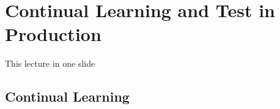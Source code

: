 
\section[Continual Learning]{Continual Learning and Test in Production}


\begin{frame}{This lecture in one slide}
  \begin{withmargin}
    \begin{tdmain}
    \end{tdmain}
    \begin{tdmargin}
    \end{tdmargin}
  \end{withmargin}
\end{frame}

\subsection{Continual Learning}

